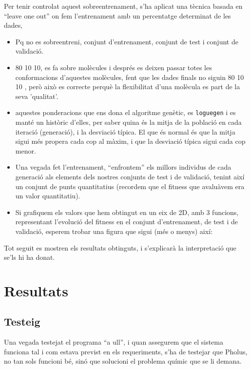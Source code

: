 Per tenir controlat aquest sobreentrenament, s'ha aplicat una tècnica basada en
``leave one out'' on fem l'entrenament amb un percentatge determinat de les
dades, 

\begin{itemize}
	\item Pq no es sobreentreni, conjunt d'entrenament, conjunt de test i conjunt
		de validació.
	\item 80 10 10, es fa sobre molècules i després es deixen passar totes les
		conformacions d'aquestes molècules, fent que les dades finals no siguin 80 10 10
		, però això es correcte perquè la flexibilitat d'una molècula es part de la seva
		'qualitat'.
	\item aquestes ponderacions que ens dona el algoritme genètic, es
		\texttt{loguegen} i es manté un històric d'elles, per saber quina és la mitja
		de la població en cada iteració (generació), i la desviació típica.  El que
		és normal és que la mitja sigui més propera cada cop al màxim, i que la
		desviació típica sigui cada cop menor.
	\item Una vegada fet l'entrenament, ``enfrontem'' els millors individus de
	cada generació als elements dels nostres conjunts de test i de validació,
	tenint així un conjunt de punts quantitatius (recordem que el fitness que
	avaluàvem era un valor quantitatiu).
	\item Si grafiquem els valors que hem obtingut en un eix de 2D, amb 3
	funcions, representant l'evolució del fitness en el conjunt d'entrenament, de
	test i de validació, esperem trobar una figura que sigui (més o menys) així:
\end{itemize}
 
Tot seguit es mostren els resultats obtinguts, i s'explicarà la interpretació
que se'ls hi ha donat.



\section{Resultats} %
\label{sec:Resultats}

\subsection{Testeig} %
\label{sub:Testeig}

Una vegada testejat el programa ``a ull'', i quan assegurem que el sistema
funciona tal i com estava previst en els requeriments, s'ha de testejar que
Pholus, no tan sols funcioni bé, sinó que solucioni el problema químic que se li
demana.

